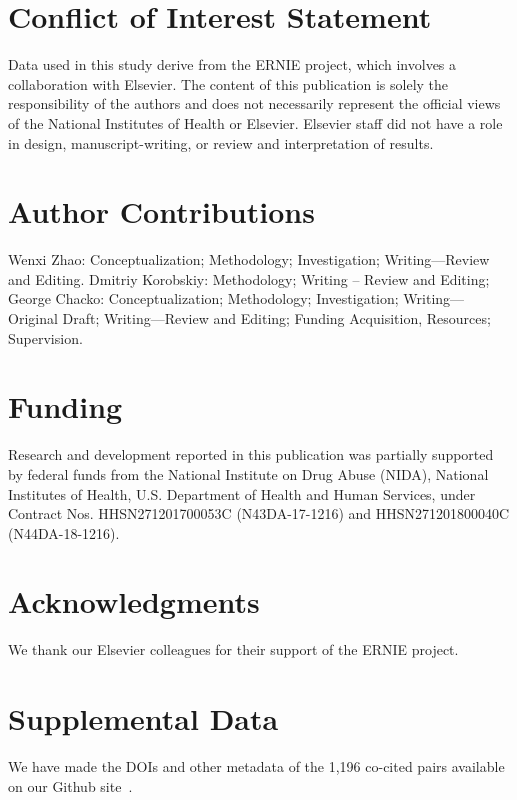 \documentclass[utf8]{frontiersSCNS}
\begin{document}

\section*{Conflict of Interest Statement}
Data used in this study derive from the ERNIE project, which involves a collaboration with Elsevier. The content of this publication is solely the responsibility of the authors and does not necessarily represent the official views of the National Institutes of Health or Elsevier.  Elsevier staff did not have a role in design, manuscript-writing, or review and interpretation of results.

\section*{Author Contributions}

Wenxi Zhao: Conceptualization; Methodology; Investigation; Writing—Review and Editing. Dmitriy Korobskiy: Methodology; Writing – Review and Editing; George Chacko: Conceptualization; Methodology; Investigation; Writing—Original Draft; Writing—Review and Editing; Funding Acquisition, Resources; Supervision.

\section*{Funding} Research and development reported in this publication was partially supported by federal funds from the National Institute on Drug Abuse (NIDA), National Institutes of Health, U.S. Department of Health and Human Services, under Contract Nos. HHSN271201700053C (N43DA-17-1216) and HHSN271201800040C (N44DA-18-1216).

\section*{Acknowledgments}
We thank our Elsevier colleagues for their support of the ERNIE project. 

\section*{Supplemental Data} We have made the DOIs and other metadata of the 1,196 co-cited pairs available on our Github site~\citep{Korobskiy2019}.
\end{document}
